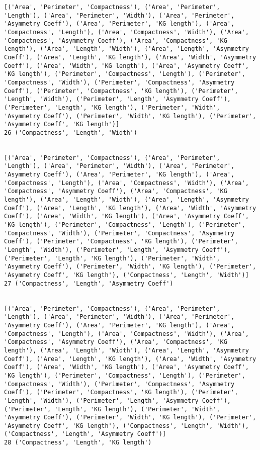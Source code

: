 \documentclass[11pt]{article}
\begin{document}
\begin{Verbatim}[commandchars=\\\{\}]
[('Area', 'Perimeter', 'Compactness'), ('Area', 'Perimeter', 'Length'), ('Area', 'Perimeter', 'Width'), ('Area', 'Perimeter', 'Asymmetry Coeff'), ('Area', 'Perimeter', 'KG length'), ('Area', 'Compactness', 'Length'), ('Area', 'Compactness', 'Width'), ('Area', 'Compactness', 'Asymmetry Coeff'), ('Area', 'Compactness', 'KG length'), ('Area', 'Length', 'Width'), ('Area', 'Length', 'Asymmetry Coeff'), ('Area', 'Length', 'KG length'), ('Area', 'Width', 'Asymmetry Coeff'), ('Area', 'Width', 'KG length'), ('Area', 'Asymmetry Coeff', 'KG length'), ('Perimeter', 'Compactness', 'Length'), ('Perimeter', 'Compactness', 'Width'), ('Perimeter', 'Compactness', 'Asymmetry Coeff'), ('Perimeter', 'Compactness', 'KG length'), ('Perimeter', 'Length', 'Width'), ('Perimeter', 'Length', 'Asymmetry Coeff'), ('Perimeter', 'Length', 'KG length'), ('Perimeter', 'Width', 'Asymmetry Coeff'), ('Perimeter', 'Width', 'KG length'), ('Perimeter', 'Asymmetry Coeff', 'KG length')]
26 ('Compactness', 'Length', 'Width')


[('Area', 'Perimeter', 'Compactness'), ('Area', 'Perimeter', 'Length'), ('Area', 'Perimeter', 'Width'), ('Area', 'Perimeter', 'Asymmetry Coeff'), ('Area', 'Perimeter', 'KG length'), ('Area', 'Compactness', 'Length'), ('Area', 'Compactness', 'Width'), ('Area', 'Compactness', 'Asymmetry Coeff'), ('Area', 'Compactness', 'KG length'), ('Area', 'Length', 'Width'), ('Area', 'Length', 'Asymmetry Coeff'), ('Area', 'Length', 'KG length'), ('Area', 'Width', 'Asymmetry Coeff'), ('Area', 'Width', 'KG length'), ('Area', 'Asymmetry Coeff', 'KG length'), ('Perimeter', 'Compactness', 'Length'), ('Perimeter', 'Compactness', 'Width'), ('Perimeter', 'Compactness', 'Asymmetry Coeff'), ('Perimeter', 'Compactness', 'KG length'), ('Perimeter', 'Length', 'Width'), ('Perimeter', 'Length', 'Asymmetry Coeff'), ('Perimeter', 'Length', 'KG length'), ('Perimeter', 'Width', 'Asymmetry Coeff'), ('Perimeter', 'Width', 'KG length'), ('Perimeter', 'Asymmetry Coeff', 'KG length'), ('Compactness', 'Length', 'Width')]
27 ('Compactness', 'Length', 'Asymmetry Coeff')


[('Area', 'Perimeter', 'Compactness'), ('Area', 'Perimeter', 'Length'), ('Area', 'Perimeter', 'Width'), ('Area', 'Perimeter', 'Asymmetry Coeff'), ('Area', 'Perimeter', 'KG length'), ('Area', 'Compactness', 'Length'), ('Area', 'Compactness', 'Width'), ('Area', 'Compactness', 'Asymmetry Coeff'), ('Area', 'Compactness', 'KG length'), ('Area', 'Length', 'Width'), ('Area', 'Length', 'Asymmetry Coeff'), ('Area', 'Length', 'KG length'), ('Area', 'Width', 'Asymmetry Coeff'), ('Area', 'Width', 'KG length'), ('Area', 'Asymmetry Coeff', 'KG length'), ('Perimeter', 'Compactness', 'Length'), ('Perimeter', 'Compactness', 'Width'), ('Perimeter', 'Compactness', 'Asymmetry Coeff'), ('Perimeter', 'Compactness', 'KG length'), ('Perimeter', 'Length', 'Width'), ('Perimeter', 'Length', 'Asymmetry Coeff'), ('Perimeter', 'Length', 'KG length'), ('Perimeter', 'Width', 'Asymmetry Coeff'), ('Perimeter', 'Width', 'KG length'), ('Perimeter', 'Asymmetry Coeff', 'KG length'), ('Compactness', 'Length', 'Width'), ('Compactness', 'Length', 'Asymmetry Coeff')]
28 ('Compactness', 'Length', 'KG length')



\end{Verbatim}
\end{document}
